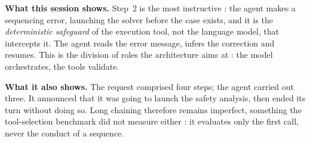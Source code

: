 \vspace{0.4cm}
\noindent
\textbf{What this session shows.} Step~2 is the most instructive : the agent
makes a sequencing error, launching the solver before the case exists, and
it is the \emph{deterministic safeguard} of the execution tool, not the language
model, that intercepts it. The agent reads the error message, infers the
correction and resumes. This is the division of roles the architecture
aims at : the model orchestrates, the tools validate.

\vspace{0.3cm}
\noindent
\textbf{What it also shows.} The request comprised four steps; the agent carried
out three. It announced that it was going to launch the safety analysis, then
ended its turn without doing so. Long chaining therefore remains imperfect,
something the tool-selection benchmark did not measure either : it evaluates only
the first call, never the conduct of a sequence.


